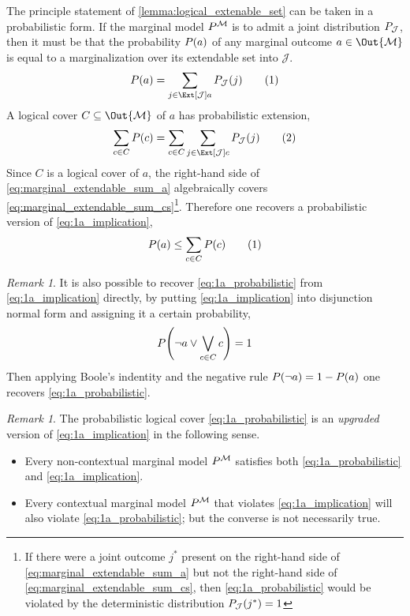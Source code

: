 \documentclass[aps, 10pt, english, twoside, pra, nofootinbib, longbibliography]{revtex4-1}
\theoremstyle{plain}
\theoremstyle{definition}
\theoremstyle{remark}
\newtheorem{remark}[theorem]{Remark}
\newcommand{\mscenario}{\mathcal{M}}
\newcommand{\jointvar}{\mathcal{J}}
\begin{document}
    The principle statement of \cref{lemma:logical_extenable_set} can be taken in a probabilistic form. If the marginal model $\prob^{\mscenario}$ is to admit a joint distribution $\prob[\jointvar]$, then it must be that the probability $\prob[][a]$ of any marginal outcome $a \in \Out{\mscenario}$ is equal to a marginalization over its extendable set into $\jointvar$.
    \[ \prob[][a] = \sum_{j \in \Ext[\jointvar]{a}}\prob[\jointvar][j] \eq \label{eq:marginal_extendable_sum_a} \]
    A logical cover $C \subseteq \Out{\mscenario}$ of $a$ has probabilistic extension,
    \[ \sum_{c \in C}\prob[][c] = \sum_{c \in C}\sum_{j \in \Ext[\jointvar]{c}}\prob[\jointvar][j] \eq \label{eq:marginal_extendable_sum_cs} \]
    Since $C$ is a logical cover of $a$, the right-hand side of \cref{eq:marginal_extendable_sum_a} algebraically covers \cref{eq:marginal_extendable_sum_cs}\footnote{If there were a joint outcome $j^*$ present on the right-hand side of \cref{eq:marginal_extendable_sum_a} but not the right-hand side of \cref{eq:marginal_extendable_sum_cs}, then \cref{eq:1a_probabilistic} would be violated by the deterministic distribution $\prob[\jointvar][j^*] = 1$}. Therefore one recovers a probabilistic version of \cref{eq:1a_implication},
    \[ \prob[][a] \leq \sum_{c \in C}\prob[][c] \eq \label{eq:1a_probabilistic} \]
    \begin{remark}
        It is also possible to recover \cref{eq:1a_probabilistic} from \cref{eq:1a_implication} directly, by putting \cref{eq:1a_implication} into disjunction normal form and assigning it a certain probability,
        \[ \prob[][\neg a \vee \bigvee_{c \in C} c] = 1 \]
        Then applying Boole's indentity and the negative rule $\prob[][\neg a] = 1 - \prob[][a]$ one recovers \cref{eq:1a_probabilistic}.
    \end{remark}
    \begin{remark}
        The probabilistic logical cover \cref{eq:1a_probabilistic} is an \textit{upgraded} version of \cref{eq:1a_implication} in the following sense.
        \begin{itemize}
            \item Every non-contextual marginal model $\prob^{\mscenario}$ satisfies both \cref{eq:1a_probabilistic} and \cref{eq:1a_implication}.
            \item Every contextual marginal model $\prob^{\mscenario}$ that violates \cref{eq:1a_implication} will also violate \cref{eq:1a_probabilistic}; but the converse is not necessarily true.
        \end{itemize}
    \end{remark}
\end{document}
